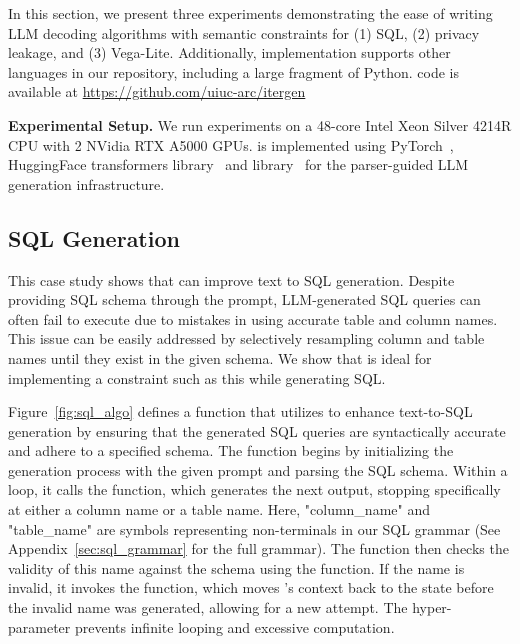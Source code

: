 \newcommand{\CS}{C\nolinebreak\hspace{-.05em}\raisebox{.6ex}{\bf \#}}

In this section, we present three experiments demonstrating the ease of writing LLM decoding algorithms with semantic constraints for (1) SQL, (2) privacy leakage, and (3) Vega-Lite.
Additionally, \Tool{} implementation supports other languages in our repository, including a large fragment of Python.
\Tool{} code is available at {\color{blue}\url{https://github.com/uiuc-arc/itergen}}

\noindent \textbf{Experimental Setup.}
We run experiments on a 48-core Intel Xeon Silver 4214R CPU with 2 NVidia RTX A5000 GPUs. 
\Tool{} is implemented using PyTorch~\cite{NEURIPS2019_9015}, HuggingFace transformers library~\cite{wolf-etal-2020-transformers} and \syncode{} library~\cite{ugare2024syncodellmgenerationgrammar} for the parser-guided LLM generation infrastructure.


\subsection{SQL Generation}
\label{sec:sql_study}

This case study shows that \Tool{} can improve text to SQL generation. 
Despite providing SQL schema through the prompt, LLM-generated SQL queries can often fail to execute due to mistakes in using accurate table and column names. 
This issue can be easily addressed by selectively resampling column and table names until they exist in the given schema. 
We show that \Tool{} is ideal for implementing a constraint such as this while generating SQL. 

Figure~\ref{fig:sql_algo} defines a function  that utilizes \Tool{} to enhance text-to-SQL generation by ensuring that the generated SQL queries are syntactically accurate and adhere to a specified schema.
The function begins by initializing the generation process with the given prompt and parsing the SQL schema. 
Within a loop, it calls the  function, which generates the next output, stopping specifically at either a column name or a table name. 
Here, "column\_name" and "table\_name" are symbols representing non-terminals in our SQL grammar (See Appendix~\ref{sec:sql_grammar} for the full grammar).
The function then checks the validity of this name against the schema using the  function. 
If the name is invalid, it invokes the  function, which moves \Tool{}'s context back to the state before the invalid name was generated, allowing for a new attempt. 
The  hyper-parameter prevents infinite looping and excessive computation.

